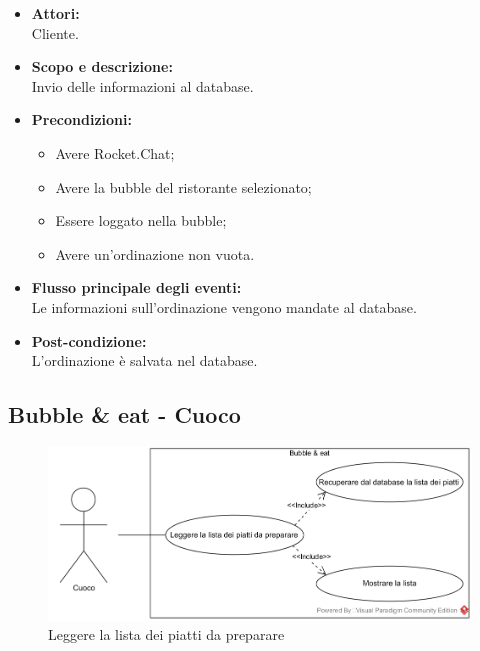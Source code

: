 
\begin{itemize}
	\item \textbf{Attori:}
	\\Cliente.
	\item \textbf{Scopo e descrizione:} 
	\\Invio delle informazioni al database.
	\item \textbf{Precondizioni:}
	\begin{itemize}
		\item Avere Rocket.Chat;
		\item Avere la bubble del ristorante selezionato;
		\item Essere loggato nella bubble;
		\item Avere un'ordinazione non vuota.
	\end{itemize}
	\item \textbf{Flusso principale degli eventi:}
	\\Le informazioni sull'ordinazione vengono mandate al database.
	\item \textbf{Post-condizione:}
	\\L'ordinazione è salvata nel database.
\end{itemize}

\subsection{Bubble \& eat - Cuoco}


\begin{figure}[H]
	\centering
	\includegraphics[width=15cm]{../../documenti/AnalisiDeiRequisiti/Diagrammi_img/uc3_5.png}
	\caption{\UCCaption{} Leggere la lista dei piatti da preparare}
\end{figure}


